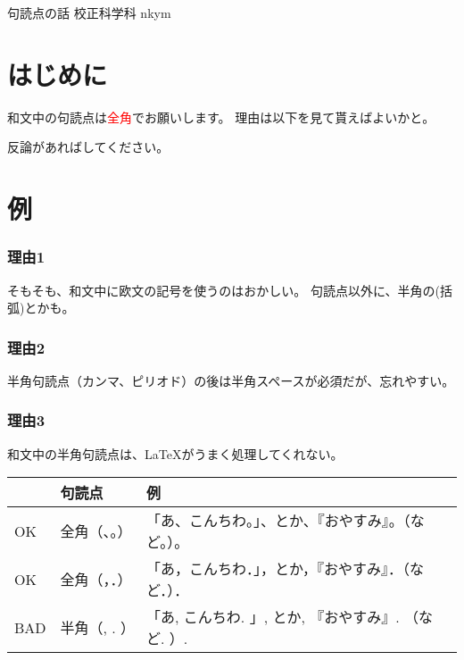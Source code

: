 \documentclass[10pt,b5paper,papersize,dvipdfmx]{jsbook}
\begin{document}
\kaishititle%
  {句読点の話}%
  {校正科学科}%
  {nkym}%

\section*{はじめに}
和文中の句読点は\textcolor{red}{全角}でお願いします。
理由は以下を見て貰えばよいかと。

反論があればしてください。

\section{例}

\subsubsection{理由1}
そもそも、和文中に欧文の記号を使うのはおかしい。
句読点以外に、半角の(括弧)とかも。

\subsubsection{理由2}
半角句読点（カンマ、ピリオド）の後は半角スペースが必須だが、忘れやすい。

\subsubsection{理由3}
和文中の半角句読点は、\LaTeX がうまく処理してくれない。

\begin{table}[H]
  \centering
  \begin{tabular}{l|ll}
    \hline
    & 句読点 & 例 \\
    \hline
    OK & 全角（、。） & 「あ、こんちわ。」、とか、『おやすみ』。（など。）。\\
    OK & 全角（，．） & 「あ，こんちわ．」，とか，『おやすみ』．（など．）．\\
    BAD & 半角（, . ） & 「あ, こんちわ. 」, とか, 『おやすみ』. （など. ）.\\
    \hline
  \end{tabular}
\end{table}
\end{document}
